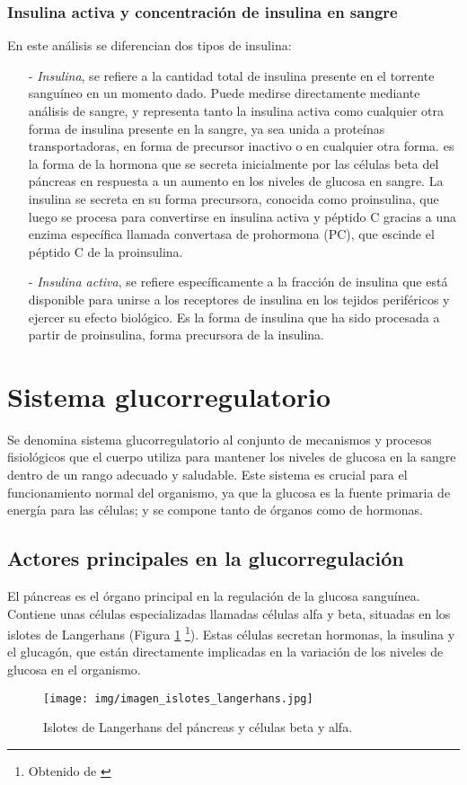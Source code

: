 \subsubsection{Insulina activa y concentración de insulina en sangre}

En este análisis se diferencian dos tipos de insulina:
\begin{enumerate}
    \item[-] \textit{Insulina}, se refiere a la cantidad total de insulina presente en el torrente sanguíneo en un momento dado. Puede medirse directamente mediante análisis de sangre, y representa tanto la insulina activa como cualquier otra forma de insulina presente en la sangre, ya sea unida a proteínas transportadoras, en forma de precursor inactivo o en cualquier otra forma.
    es la forma de la hormona que se secreta inicialmente por las células beta del páncreas en respuesta a un aumento en los niveles de glucosa en sangre. La insulina se secreta en su forma precursora, conocida como proinsulina, que luego se procesa para convertirse en insulina activa y péptido C gracias a una enzima específica llamada convertasa de prohormona (PC), que escinde el péptido C de la proinsulina.
    \item[-] \textit{Insulina activa}, se refiere específicamente a la fracción de insulina que está disponible para unirse a los receptores de insulina en los tejidos periféricos y ejercer su efecto biológico. Es la forma de insulina que ha sido procesada a partir de proinsulina, forma precursora de la insulina. 
\end{enumerate}


\section{Sistema glucorregulatorio}

Se denomina sistema glucorregulatorio al conjunto de mecanismos y procesos fisiológicos que el cuerpo utiliza para mantener los niveles de glucosa en la sangre dentro de un rango adecuado y saludable. Este sistema es crucial para el funcionamiento normal del organismo, ya que la glucosa es la fuente primaria de energía para las células; y se compone tanto de órganos como de hormonas.

\subsection{Actores principales en la glucorregulación}

El páncreas es el órgano principal en la regulación de la glucosa sanguínea. Contiene unas células especializadas llamadas células alfa y beta, situadas en los islotes de Langerhans (Figura \ref{fig:islotes} 
 \footnote{Obtenido de \cite{britannica_islets}}). Estas células secretan hormonas, la insulina y el glucagón, que están directamente implicadas en la variación de los niveles de glucosa en el organismo. 
\begin{figure}[h]
    \centering
    \texttt{[image: img/imagen\_islotes\_langerhans.jpg]}
    \caption{Islotes de Langerhans del páncreas y células beta y alfa.}
    \label{fig:islotes}
\end{figure}

